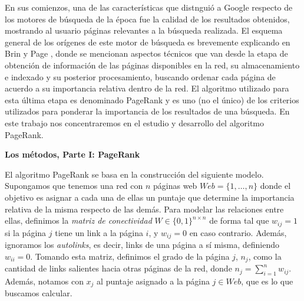 En sus comienzos, una de las caracter\'isticas que distngui\'o a Google respecto de los motores de b\'usqueda de la \'epoca
fue la calidad de los resultados obtenidos, mostrando al usuario p\'aginas relevantes a la
b\'usqueda realizada. El esquema general de los or\'igenes de este motor de b\'usqueda es brevemente explicando en 
Brin y Page \cite{Brin1998}, donde se mencionan aspectos t\'ecnicos que van desde la etapa de obtenci\'on de
informaci\'on de las p\'aginas disponibles en la red, su almacenamiento e indexado y su posterior procesamiento,
buscando ordenar cada p\'agina de acuerdo a su importancia relativa dentro de la red. El algoritmo utilizado para esta
\'ultima etapa es denominado PageRank y es uno (no el \'unico) de los criterios utilizados para ponderar la importancia
de los resultados de una b\'usqueda. En este trabajo nos concentraremos en el estudio y desarrollo del algoritmo
PageRank.

\vskip 5pt
\noindent\textbf{Los m\'etodos, Parte I: PageRank}
\vskip 5pt

El algoritmo PageRank se basa en la construcci\'on del siguiente modelo. Supongamos que tenemos una red con $n$ p\'aginas 
web $Web = \{1,\dots,n\}$ donde
el objetivo es asignar a cada una de ellas un puntaje que determine la importancia relativa de la misma respecto de las
dem\'as. Para modelar las relaciones entre ellas, definimos la \emph{matriz de conectividad} $W \in \{0,1\}^{n \times n}$ 
de forma tal que $w_{ij} = 1$ si la p\'agina $j$ tiene un link a la p\'agina $i$, y $w_{ij} = 0$ en caso contrario. 
Adem\'as, ignoramos los \emph{autolinks}, es decir, links de una p\'agina a s\'i misma, definiendo $w_{ii} = 0$. Tomando 
esta matriz, definimos el grado de la p\'agina $j$, $n_j$, como la cantidad de links salientes hacia otras p\'aginas 
de la red, donde $n_j = \sum_{i = 1}^n w_{ij}$. Adem\'as, notamos con $x_j$ al puntaje asignado a la p\'agina $j\in
Web$, que es lo que buscamos calcular.

